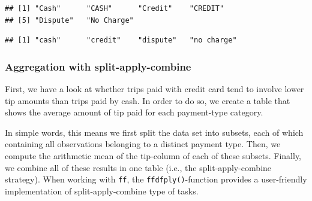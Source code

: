 \documentclass[
  12pt,
]{style/krantz}
\newenvironment{Shaded}{\begin{snugshade}}{\end{snugshade}}
\newcommand{\AttributeTok}[1]{\textcolor[rgb]{0.77,0.63,0.00}{#1}}
\newcommand{\CommentTok}[1]{\textcolor[rgb]{0.56,0.35,0.01}{\textit{#1}}}
\newcommand{\FunctionTok}[1]{\textcolor[rgb]{0.00,0.00,0.00}{#1}}
\newcommand{\NormalTok}[1]{#1}
\newcommand{\OtherTok}[1]{\textcolor[rgb]{0.56,0.35,0.01}{#1}}
\newcommand{\SpecialCharTok}[1]{\textcolor[rgb]{0.00,0.00,0.00}{#1}}
\newcommand{\StringTok}[1]{\textcolor[rgb]{0.31,0.60,0.02}{#1}}
\begin{document}
\begin{verbatim}
## [1] "Cash"      "CASH"      "Credit"    "CREDIT"   
## [5] "Dispute"   "No Charge"
\end{verbatim}

\begin{Shaded}
\end{Shaded}

\begin{verbatim}
## [1] "cash"      "credit"    "dispute"   "no charge"
\end{verbatim}

\hypertarget{aggregation-with-split-apply-combine}{%
\subsubsection{Aggregation with split-apply-combine}\label{aggregation-with-split-apply-combine}}

First, we have a look at whether trips paid with credit card tend to involve lower tip amounts than trips paid by cash. In order to do so, we create a table that shows the average amount of tip paid for each payment-type category.

In simple words, this means we first split the data set into subsets, each of which containing all observations belonging to a distinct payment type. Then, we compute the arithmetic mean of the tip-column of each of these subsets. Finally, we combine all of these results in one table (i.e., the split-apply-combine strategy). When working with \texttt{ff}, the \texttt{ffdfply()}-function provides a user-friendly implementation of split-apply-combine type of tasks.
\end{document}
